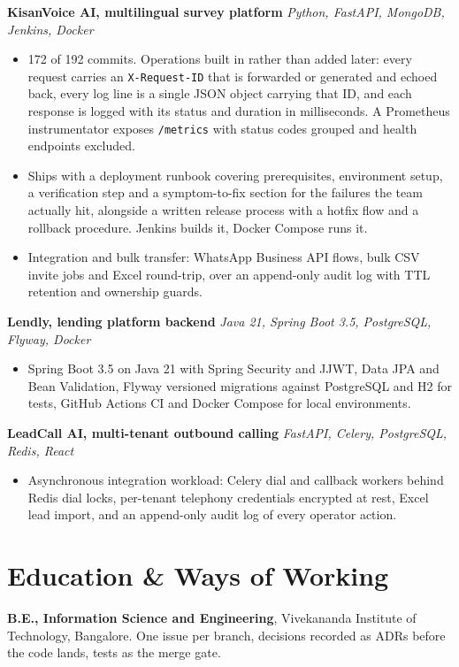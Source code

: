 \documentclass[10pt,a4paper]{article}
\begin{document}
\textbf{KisanVoice AI, multilingual survey platform} \textit{Python, FastAPI, MongoDB, Jenkins, Docker}
\begin{itemize}
  \item 172 of 192 commits. Operations built in rather than added later: every request carries an
        \texttt{X-Request-ID} that is forwarded or generated and echoed back, every log line is a
        single JSON object carrying that ID, and each response is logged with its status and
        duration in milliseconds. A Prometheus instrumentator exposes \texttt{/metrics} with status
        codes grouped and health endpoints excluded.
  \item Ships with a deployment runbook covering prerequisites, environment setup, a verification
        step and a symptom-to-fix section for the failures the team actually hit, alongside a
        written release process with a hotfix flow and a rollback procedure. Jenkins builds it,
        Docker Compose runs it.
  \item Integration and bulk transfer: WhatsApp Business API flows, bulk CSV invite jobs and Excel
        round-trip, over an append-only audit log with TTL retention and ownership guards.
\end{itemize}

\vspace{1pt}
\textbf{Lendly, lending platform backend} \textit{Java 21, Spring Boot 3.5, PostgreSQL, Flyway, Docker}
\begin{itemize}
  \item Spring Boot 3.5 on Java 21 with Spring Security and JJWT, Data JPA and Bean Validation,
        Flyway versioned migrations against PostgreSQL and H2 for tests, GitHub Actions CI and
        Docker Compose for local environments.
\end{itemize}

\vspace{1pt}
\textbf{LeadCall AI, multi-tenant outbound calling} \textit{FastAPI, Celery, PostgreSQL, Redis, React}
\begin{itemize}
  \item Asynchronous integration workload: Celery dial and callback workers behind Redis dial locks,
        per-tenant telephony credentials encrypted at rest, Excel lead import, and an append-only
        audit log of every operator action.
\end{itemize}

\section{Education \& Ways of Working}
\textbf{B.E., Information Science and Engineering}, Vivekananda Institute of Technology, Bangalore.
One issue per branch, decisions recorded as ADRs before the code lands, tests as the merge gate.
\end{document}
